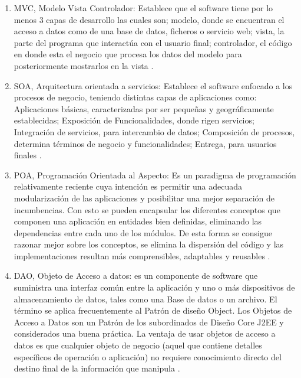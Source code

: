 \documentclass[a4paper,12pt,openany,oneside]{book}
\begin{document}
\begin{enumerate}

\item MVC, Modelo Vista Controlador: Establece que el software tiene por lo menos 3 capas de desarrollo las cuales son; modelo, donde se encuentran el acceso a datos como de una base de datos, ficheros o servicio web; vista, la parte del programa que interactúa con el usuario final; controlador, el código en donde esta el negocio que procesa los datos del modelo para posteriormente mostrarlos en la vista \cite{data22}.

\item SOA, Arquitectura orientada a servicios: Establece el software enfocado a los procesos de negocio, teniendo distintas capas de aplicaciones como: Aplicaciones básicas, caracterizadas por ser pequeñas y geográficamente establecidas; Exposición de Funcionalidades, donde rigen servicios; Integración de servicios, para intercambio de datos; Composición de procesos, determina términos de negocio y funcionalidades; Entrega, para usuarios finales \cite{data23}.

\item POA, Programación Orientada al Aspecto: Es un paradigma de programación relativamente reciente cuya intención es permitir una adecuada modularización de las aplicaciones y posibilitar una mejor separación de incumbencias. Con esto se pueden encapsular los diferentes conceptos que componen una aplicación en entidades bien definidas, eliminando las dependencias entre cada uno de los módulos. De esta forma se consigue razonar mejor sobre los conceptos, se elimina la dispersión del código y las implementaciones resultan más comprensibles, adaptables y reusables \cite{data24}.

\item DAO, Objeto de Acceso a datos: es un componente de software que suministra una interfaz común entre la aplicación y uno o más dispositivos de almacenamiento de datos, tales como una Base de datos o un archivo. El término se aplica frecuentemente al Patrón de diseño Object. Los Objetos de Acceso a Datos son un Patrón de los subordinados de Diseño Core J2EE y considerados una buena práctica. La ventaja de usar objetos de acceso a datos es que cualquier objeto de negocio (aquel que contiene detalles específicos de operación o aplicación) no requiere conocimiento directo del destino final de la información que manipula \cite{data25}.

\end{enumerate}
\end{document}
